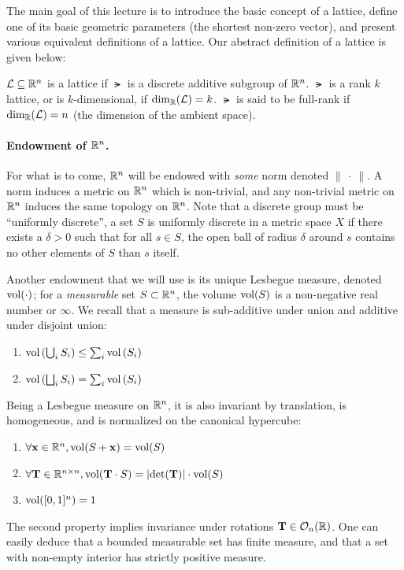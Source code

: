 The main goal of this lecture is to introduce the basic concept of a lattice,
define one of its basic geometric parameters (the shortest non-zero
vector), and present various equivalent definitions of a lattice. Our abstract 
definition of a lattice is given below:

\begin{definition}[Lattice]
$\mathcal{L} \subseteq \mathbb{R}^n$ is a lattice if $\lat$ is a discrete additive subgroup of
$\mathbb{R}^n$. $\lat$ is a rank $k$ lattice, or is $k$-dimensional, if $\dim_{\mathbb{R}}(\mathcal{L}) = k$.
$\lat$ is said to be full-rank if $\dim_{\mathbb{R}}(\mathcal{L}) = n$ (the dimension of the ambient
space).  
\end{definition}

\paragraph{Endowment of $\mathbb{R}^n$.} For what is to come, $\mathbb{R}^n$ will be endowed with {\em some} norm denoted $\|~\cdot~\|$.
A norm induces a metric on $\mathbb{R}^n$ which is non-trivial, and any non-trivial metric on $\mathbb{R}^n$ induces the same topology on $\mathbb{R}^n$. Note that a discrete group must be ``uniformly discrete'', a set $S$ is uniformly discrete in a metric space $X$ if there exists a $\delta > 0$ such that for all $s \in S$, the open ball of radius $\delta$ around $s$ contains no other elements of $S$ than $s$ itself.

Another endowment that we will use is its unique Lesbegue measure, denoted $\mathrm{vol}(\cdot)$; for a {\em measurable} set $S \subset \mathbb{R}^n$, the volume $\mathrm{vol}(S)$ is a non-negative real number or $\infty$. We recall that a measure is sub-additive under union and additive under disjoint union: 

\begin{enumerate}
	\item $\mathrm{vol}\left(\bigcup_i S_i \right) \leq \sum_i \mathrm{vol}\left(S_i \right)$
	\item $\mathrm{vol}\left(\bigsqcup_i S_i \right) = \sum_i \mathrm{vol}\left(S_i \right)$
\end{enumerate}

Being a Lesbegue measure on $\mathbb{R}^n$, it is also invariant by translation, is homogeneous, and is normalized on the canonical hypercube: 
\begin{enumerate}
	\item $\forall \mathbf{x} \in \mathbb{R}^n, \mathrm{vol}(S + \mathbf{x}) = \mathrm{vol}(S)$ 
	\item $\forall \mathbf{T} \in \mathbb{R}^{n \times n}, \mathrm{vol}(\mathbf{T} \cdot S) = |\mathrm{det}(\mathbf{T})| \cdot \mathrm{vol}(S)$ 
	\item $\mathrm{vol}([0, 1]^n) = 1$ 
\end{enumerate}
The second property implies invariance under rotations $\mathbf{T} \in \mathcal O_n(\mathbb{R})$. One can easily deduce that a bounded measurable set has finite measure, and that a set with non-empty interior has strictly positive measure.

